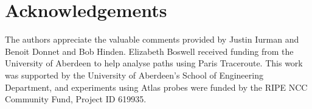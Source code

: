 \documentclass[conference]{IEEEtran}
\begin{document}
\section*{Acknowledgements}

The authors appreciate the valuable comments provided by Justin Iurman and Benoit Donnet and Bob Hinden. Elizabeth Boswell received funding from the University of Aberdeen to help analyse paths using Paris Traceroute. This work was supported by the University of Aberdeen's School of Engineering Department, and experiments using Atlas probes were funded by the RIPE NCC Community Fund, Project ID 619935.


\small

\end{document}
